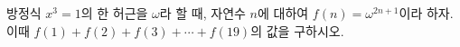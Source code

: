 방정식 $x^3=1$의 한 허근을 $\omega$라 할 때, 자연수 $n$에 대하여 $f(n)=\omega^{2n+1}$이라 하자. 이때 $f(1)+f(2)+f(3)+\cdots+f(19)$의 값을 구하시오.
